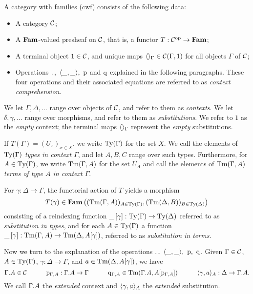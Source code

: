 \documentclass{mscs}
\begin{document}
\begin{definition}\label{def:Cwfobj}
A category with families (cwf) consists of the following data:

\begin{itemize}
\item A category ${\mathcal C}$;

\item A $\textbf{Fam}$-valued presheaf on ${\mathcal C}$, that is, a functor
$T : {\mathcal C}^{\text{op}} \to \textbf{Fam}$;

\item A terminal object $1\in {\mathcal C}$, and unique maps
$\langle  \rangle_\Gamma \in {\mathcal C}(\Gamma, 1)$ for all objects $\Gamma$ of ${\mathcal C}$;

\item Operations ${.\,},~\langle \_,\_ \rangle,~\mathrm{p}$ and $\mathrm{q}$
explained in the following paragraphs.
These four operations and their associated equations
are referred to as \emph{context comprehension}.
\end{itemize}

We let $\Gamma, \Delta,\ldots$ range over objects of ${\mathcal C}$,
and refer to them as \emph{contexts}.
We let $\delta, \gamma,\ldots$ range over morphisms,
and refer to them as \emph{substitutions}.
We refer to $1$ as the \emph{empty} context; the terminal maps
$\langle  \rangle_\Gamma$ represent the \emph{empty} substitutions.

If $T(\Gamma) = (U_x)_{x\in X}$, we write $\mathrm{Ty}(\Gamma)$ for the set $X$.
We call the elements of $\mathrm{Ty}(\Gamma)$ \emph{types in context $\Gamma$},
and let $A, B, C$ range over such types.
Furthermore, for $A \in \mathrm{Ty}(\Gamma)$, we write $\mathrm{Tm}(\Gamma, A)$ for the set $U_A$
and call the elements of $\mathrm{Tm}(\Gamma, A)$
\emph{terms of type $A$ in context $\Gamma$}.

For $\gamma : \Delta \to \Gamma$,
the functorial action of $T$ yields a morphism
\[
T(\gamma) \in  \Fam\left((\Tm(\Gamma, A))_{A\in \Ty(\Gamma)}, %
                (\Tm(\Delta, B))_{B\in \Ty(\Delta)}\right)
\]
consisting of a reindexing function $\_\,[\gamma] : \mathrm{Ty}(\Gamma) \to
\mathrm{Ty}(\Delta)$ referred to as \emph{substitution in types}, and for each $A\in
\mathrm{Ty}(\Gamma)$ a function $\_\,[\gamma] : \mathrm{Tm}(\Gamma, A) \to \mathrm{Tm}(\Delta,
A[\gamma])$, referred to as \emph{substitution in terms}.

Now we turn to the explanation of the operations
${.\,},~\langle \_,\_ \rangle,~\mathrm{p},~\mathrm{q}$.
Given $\Gamma \in {\mathcal C}$, $A \in \mathrm{Ty}(\Gamma)$, $\gamma : \Delta \to \Gamma$,
and $a\in \mathrm{Tm}(\Delta, A[\gamma])$, we have
\[
\Gamma . A \in {\mathcal C}
\quad\qquad
\mathrm{p}_{\Gamma, A} : \Gamma . A \to \Gamma
\quad\qquad
\mathrm{q}_{\Gamma, A} \in \mathrm{Tm}(\Gamma. A, A[\mathrm{p}_{\Gamma,A}])
\quad\qquad
\langle \gamma, a \rangle_A : \Delta \to \Gamma . A.
\]
We call $\Gamma . A$ the \emph{extended} context
and $\langle \gamma, a \rangle_A$ the \emph{extended} substitution.


\end{definition}
\end{document}
